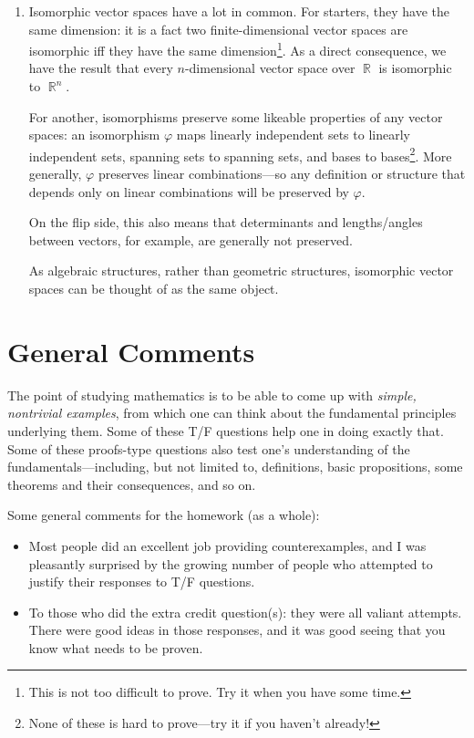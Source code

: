 \documentclass{amsart}
\theoremstyle{definition}
\theoremstyle{definition}
\DeclareMathOperator{\R}{\mathbb{R}}
\DeclareMathOperator{\1}{\mathbbm{1}}
\renewcommand{\phi}{\varphi}
\begin{document}
\begin{enumerate}
\begin{enumerate}[label=\arabic*.]
			
			
			\item Isomorphic vector spaces have a lot in common. For starters, they have the same dimension: it is a fact two finite-dimensional vector spaces are isomorphic iff they have the same dimension\footnote{This is not too difficult to prove. Try it when you have some time.}. As a direct consequence, we have the result that every $n$-dimensional vector space over $\R$ is isomorphic to $\R^n$.
			
			For another, isomorphisms preserve some likeable properties of any vector spaces: an isomorphism $\phi$ maps linearly independent sets to linearly independent sets, spanning sets to spanning sets, and bases to bases\footnote{None of these is hard to prove---try it if you haven't already!}. More generally, $\phi$ preserves linear combinations---so any definition or structure that depends only on linear combinations will be preserved by $\phi$.
			
			On the flip side, this also means that determinants and lengths/angles between vectors, for example, are generally not preserved.
			
			As algebraic structures, rather than geometric structures, isomorphic vector spaces can be thought of as the same object.
		\end{enumerate}
		
		
	\end{enumerate}
	
	\clearpage
	
	
	
\section*{General Comments}


The point of studying mathematics is to be able to come up with \textit{simple, nontrivial examples}, from which one can think about the fundamental principles underlying them. Some of these T/F questions help one in doing exactly that. Some of these proofs-type questions also test one's understanding of the fundamentals---including, but not limited to, definitions, basic propositions, some theorems and their consequences, and so on.

Some general comments for the homework (as a whole):
\begin{itemize}
	\item Most people did an excellent job providing counterexamples, and I was pleasantly surprised by the growing number of people who attempted to justify their responses to T/F questions.
	
	\item To those who did the extra credit question(s): they were all valiant attempts. There were good ideas in those responses, and it was good seeing that you know what needs to be proven.
\end{itemize}
\end{document}
